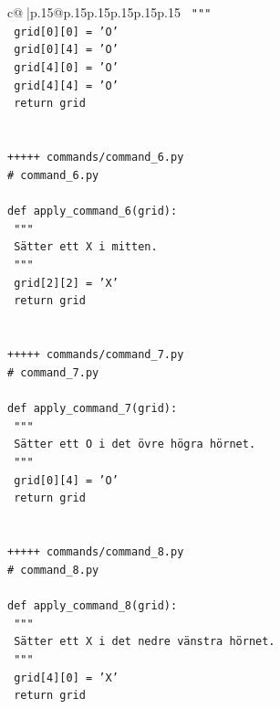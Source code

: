 \documentclass{article}
\begin{document}
{\begin{supertabular}{c@{$\;$}|p{.15\linewidth}@{}p{.15\linewidth}p{.15\linewidth}p{.15\linewidth}p{.15\linewidth}p{.15\linewidth}}
{{{\texttt{    """} \\
\texttt{    grid{[}0{]}{[}0{]} = 'O'} \\
\texttt{    grid{[}0{]}{[}4{]} = 'O'} \\
\texttt{    grid{[}4{]}{[}0{]} = 'O'} \\
\texttt{    grid{[}4{]}{[}4{]} = 'O'} \\
\texttt{    return grid} \\
\\ 
\\ 
\texttt{+++++ commands/command\_6.py} \\
\texttt{\# command\_6.py} \\
\\ 
\texttt{def apply\_command\_6(grid):} \\
\texttt{    """} \\
\texttt{    Sätter ett X i mitten.} \\
\texttt{    """} \\
\texttt{    grid{[}2{]}{[}2{]} = 'X'} \\
\texttt{    return grid} \\
\\ 
\\ 
\texttt{+++++ commands/command\_7.py} \\
\texttt{\# command\_7.py} \\
\\ 
\texttt{def apply\_command\_7(grid):} \\
\texttt{    """} \\
\texttt{    Sätter ett O i det övre högra hörnet.} \\
\texttt{    """} \\
\texttt{    grid{[}0{]}{[}4{]} = 'O'} \\
\texttt{    return grid} \\
\\ 
\\ 
\texttt{+++++ commands/command\_8.py} \\
\texttt{\# command\_8.py} \\
\\ 
\texttt{def apply\_command\_8(grid):} \\
\texttt{    """} \\
\texttt{    Sätter ett X i det nedre vänstra hörnet.} \\
\texttt{    """} \\
\texttt{    grid{[}4{]}{[}0{]} = 'X'} \\
\texttt{    return grid} \\
}}}
\end{supertabular}}
\end{document}
